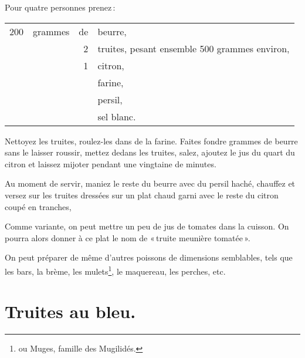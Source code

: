 Pour quatre personnes prenez :

\medskip

\footnotesize
\begin{longtable}{rrrp{16em}}
    200 & grammes & de & beurre,                                                                          \\
        &         &  2 & truites, pesant ensemble 500 grammes environ,                                    \\
        &         &  1 & citron,                                                                          \\
        &         &    & farine,                                                                          \\
        &         &    & persil,                                                                          \\
        &         &    & sel blanc.                                                                       \\
\end{longtable}
\normalsize

Nettoyez les truites, roulez-les dans de la farine. Faites fondre {\mmm} grammes
de beurre sans le laisser roussir, mettez dedans les truites, salez, ajoutez le
jus du quart du citron et laissez mijoter pendant une vingtaine de minutes.

Au moment de servir, maniez le reste du beurre avec du persil haché, chauffez
et versez sur les truites dressées sur un plat chaud garni avec le reste du
citron coupé en tranches,

\sk

Comme variante, on peut mettre un peu de jus de tomates dans la cuisson. On
pourra alors donner à ce plat le nom de « truite meunière tomatée ».

On peut préparer de même d'autres poissons de dimensions semblables, tels que
les bars, la brème, les mulets\footnote{ou Muges, famille des Mugilidés.}, le
maquereau, les perches, etc.

\section*{\centering Truites au bleu.}

